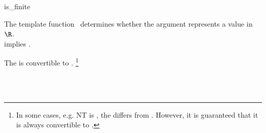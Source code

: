 \begin{ccRefFunction}{is_finite}

\ccDefinition

The template function \ccRefName\ determines whether the argument represents 
a value in $\R$.\\

 implies .

\ccRefines 


        { The  is convertible to . 
          \footnote{In some cases, e.g. NT is , the 
           differs from . 
          However, it is guaranteed that it is always convertible to .}
        }

\ccSeeAlso
{} \\
\\
 
\end{ccRefFunction}